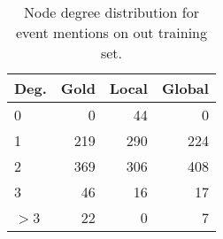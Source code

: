 \begin{table}[t]
{\footnotesize
\hfill{}
\begin{tabular}{|l|r|r|r|}
\hline
\textbf{Deg.} &\textbf{Gold}&\textbf{Local} & \textbf{Global}\\
\hline
0            &     0        &    44       &   0 \\ 
1            &     219        &    290       & 224  \\ 
2            &     369        &    306       &  408  \\ 
3            &     46        &     16      &  17 \\ 
$>$3           &     22        &     0      &  7 \\
\hline
\end{tabular}}
\hfill{}
\caption{Node degree distribution for event mentions on out training set.}
\label{tab:degree}
\end{table}






















